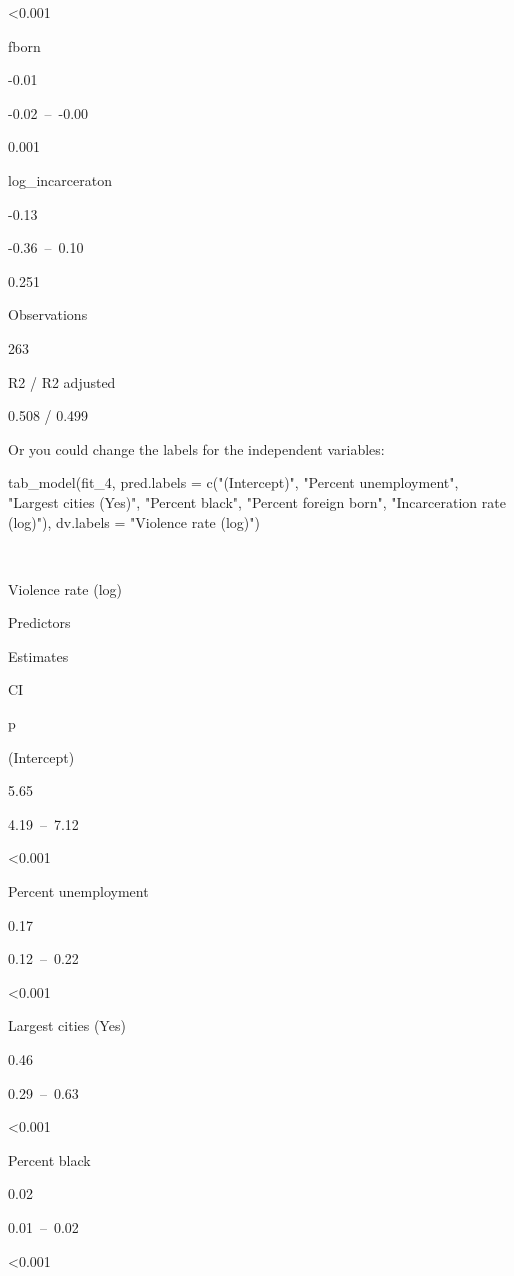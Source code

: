 \documentclass[
]{book}
\newenvironment{Shaded}{\begin{snugshade}}{\end{snugshade}}
\newcommand{\AttributeTok}[1]{\textcolor[rgb]{0.77,0.63,0.00}{#1}}
\newcommand{\FunctionTok}[1]{\textcolor[rgb]{0.00,0.00,0.00}{#1}}
\newcommand{\NormalTok}[1]{#1}
\newcommand{\StringTok}[1]{\textcolor[rgb]{0.31,0.60,0.02}{#1}}
\begin{document}
\textless0.001

fborn

-0.01

-0.02~--~-0.00

0.001

log\_incarceraton

-0.13

-0.36~--~0.10

0.251

Observations

263

R2 / R2 adjusted

0.508 / 0.499

Or you could change the labels for the independent variables:

\begin{Shaded}
\begin{Highlighting}[]
\FunctionTok{tab\_model}\NormalTok{(fit\_4, }\AttributeTok{pred.labels =} \FunctionTok{c}\NormalTok{(}\StringTok{"(Intercept)"}\NormalTok{, }\StringTok{"Percent unemployment"}\NormalTok{, }\StringTok{"Largest cities (Yes)"}\NormalTok{, }\StringTok{"Percent black"}\NormalTok{, }\StringTok{"Percent foreign born"}\NormalTok{, }\StringTok{"Incarceration rate (log)"}\NormalTok{), }\AttributeTok{dv.labels =} \StringTok{"Violence rate (log)"}\NormalTok{)}
\end{Highlighting}
\end{Shaded}

~

Violence rate (log)

Predictors

Estimates

CI

p

(Intercept)

5.65

4.19~--~7.12

\textless0.001

Percent unemployment

0.17

0.12~--~0.22

\textless0.001

Largest cities (Yes)

0.46

0.29~--~0.63

\textless0.001

Percent black

0.02

0.01~--~0.02

\textless0.001
\end{document}
